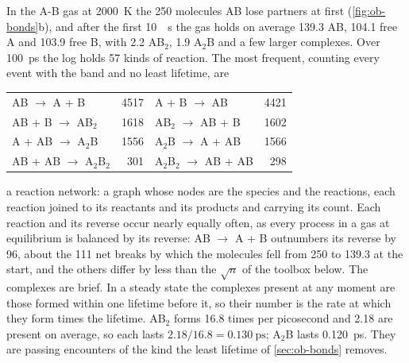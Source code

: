 In the A-B gas at \SI{2000}{\kelvin} the 250 molecules AB lose partners
at first (\cref{fig:ob-bonds}b), and after the first \SI{10}{\pico
\second} the gas holds on average 139.3 AB, 104.1 free A and 103.9 free B,
with 2.2 AB$_2$, 1.9 A$_2$B and a few larger complexes.
Over \SI{100}{\pico\second} the log holds 57 kinds of reaction. The most
frequent, counting every event with the band and no least lifetime, are
\begin{center}
\begin{tabular}{@{}lr@{\qquad}lr@{}}
AB $\to$ A + B & 4517 & A + B $\to$ AB & 4421\\
AB + B $\to$ AB$_2$ & 1618 & AB$_2$ $\to$ AB + B & 1602\\
A + AB $\to$ A$_2$B & 1556 & A$_2$B $\to$ A + AB & 1566\\
AB + AB $\to$ A$_2$B$_2$ & 301 & A$_2$B$_2$ $\to$ AB + AB & 298
\end{tabular}
\end{center}
a reaction network: a graph whose nodes are the species and the
reactions, each reaction joined to its reactants and its products and
carrying its count. Each reaction and its reverse occur
nearly equally often, as every process in a gas at equilibrium is
balanced by its reverse: AB $\to$ A + B outnumbers its reverse by 96, about
the 111 net breaks by which the molecules fell from 250 to 139.3 at the
start, and the others differ by less than the $\sqrt n$ of the toolbox
below. The complexes are brief. In a steady state the complexes present
at any moment are those formed within one lifetime before it, so their
number is the rate at which they form times the lifetime. AB$_2$ forms
16.8 times per picosecond and 2.18 are present on average, so each lasts
$2.18/16.8 = \SI{0.130}{\pico\second}$; A$_2$B lasts
\SI{0.120}{\pico\second}. They are passing
encounters of the kind the least lifetime of \cref{sec:ob-bonds} removes.

